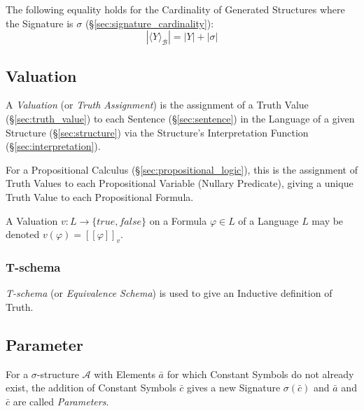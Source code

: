 The following equality holds for the Cardinality of Generated
Structures where the Signature is $\sigma$
(\S\ref{sec:signature_cardinality}):
\[
  |\langle Y \rangle_\mathcal{B}| = |Y| + |\sigma|
\]



\subsection{Valuation}\label{sec:valuation}

A \emph{Valuation} (or \emph{Truth Assignment}) is the assignment of a
Truth Value (\S\ref{sec:truth_value}) to each Sentence
(\S\ref{sec:sentence}) in the Language of a given Structure
(\S\ref{sec:structure}) via the Structure's Interpretation Function
(\S\ref{sec:interpretation}).

For a Propositional Calculus (\S\ref{sec:propositional_logic}), this
is the assignment of Truth Values to each Propositional Variable
(Nullary Predicate), giving a unique Truth Value to each Propositional
Formula.

A Valuation $v : L \rightarrow \{true, false\}$ on a Formula $\varphi \in
L$ of a Language $L$ may be denoted $v(\varphi) = [[\varphi]]_v$.



\subsubsection{T-schema}\label{sec:t_schema}

\emph{T-schema} (or \emph{Equivalence Schema}) is used to give an
Inductive definition of Truth.



\subsection{Parameter}\label{sec:parameter}

For a $\sigma$-structure $\mathcal{A}$ with Elements $\bar{a}$ for
which Constant Symbols do not already exist, the addition of Constant
Symbols $\bar{c}$ gives a new Signature $\sigma(\bar{c})$ and
$\bar{a}$ and $\bar{c}$ are called \emph{Parameters}.



